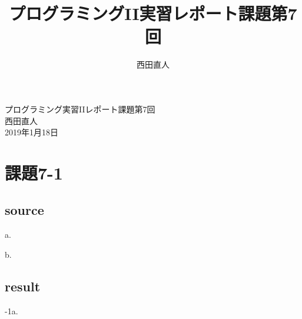 \documentclass[10pt,a4paper]{jsarticle}
\title{プログラミングII実習レポート課題第7回}
\author{西田直人}
\begin{document}
\begin{center}
{\LARGE プログラミング実習IIレポート課題第7回} \\
\large
西田直人 \\ 2019年1月18日
\end{center}
\normalsize
\section{課題7-1}

\subsection{source}
\noindent a.







b.





\subsection{result}
-1a.
\end{document}
